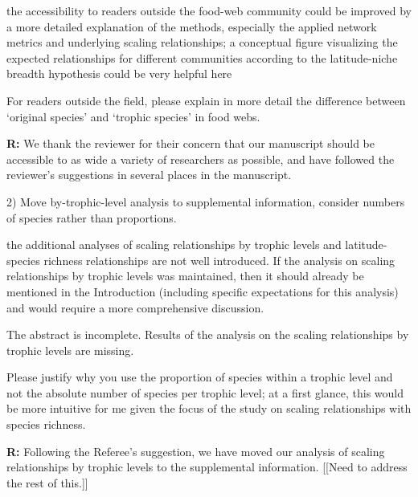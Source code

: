 \documentclass[12pt]{letter}
\newenvironment{refquote}{\bigskip \begin{it}}{\end{it}\smallskip}
\begin{document}
  \begin{refquote}

    the accessibility to readers outside the food-web community could be
    improved by a more detailed explanation of the methods, especially the
    applied network metrics and underlying scaling relationships; a conceptual
    figure visualizing the expected relationships for different communities
    according to the latitude-niche breadth hypothesis could be very helpful
    here

    \smallskip

     For readers outside the field, please explain in more detail the
     difference between `original species' and `trophic species' in food webs.

  \end{refquote}


  \textbf{R:} We thank the reviewer for their concern that our manuscript
  should be accessible to as wide a variety of    researchers as possible, and
  have followed the reviewer's suggestions in several places in the manuscript.


  2) Move by-trophic-level analysis to supplemental information, consider
  numbers of species rather than proportions.

  \begin{refquote}

    the additional analyses of scaling relationships by trophic levels and
    latitude-species richness relationships are not well introduced. If the
    analysis on scaling relationships by trophic levels was maintained, then
    it should already be mentioned in the Introduction (including specific
    expectations for this analysis) and would require a more comprehensive
    discussion.

    \smallskip

    The abstract is incomplete. Results of the analysis on the scaling
    relationships by trophic levels are missing.

    \smallskip

    Please justify why you use the proportion of species within a trophic
    level and not the absolute number of species per trophic level; at a first
    glance, this would be more intuitive for me given the focus of the study
    on scaling relationships with species richness.

  \end{refquote}

  \textbf{R:} Following the Referee's suggestion, we have moved our analysis of scaling relationships by trophic levels to the supplemental information. [[Need to address the rest of this.]]
\end{document}
